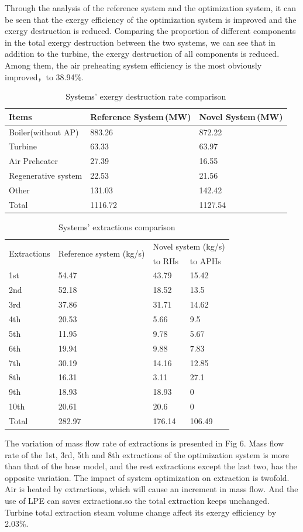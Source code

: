 \documentclass[preprint,12pt]{elsarticle}
\begin{document}
Through the analysis of the reference system and the optimization system, it can be seen that the exergy efficiency of the optimization system is improved and the exergy destruction is reduced.
Comparing the proportion of different components in the total exergy destruction between the two systems, we can see that in addition to the turbine, the exergy destruction of all components is reduced. 
Among them, the air preheating system efficiency is the most obviously improved，to 38.94\%.


\begin{table}
\caption{Systems' exergy destruction rate comparison }
\label{table:system exergy campare}
\centering
\begin{tabular}{lll}
\toprule 
Items & Reference System\,(MW) & Novel System\,(MW)\tabularnewline
\midrule 
Boiler(without AP) & 883.26 & 872.22\tabularnewline
Turbine & 63.33 & 63.97\tabularnewline
Air Preheater  & 27.39 & 16.55\tabularnewline
Regenerative system & 22.53 & 21.56\tabularnewline
Other & 131.03 & 142.42 \tabularnewline
Total & 1116.72 & 1127.54\tabularnewline
\bottomrule
\end{tabular}
\end{table}



\begin{table}
\label{table:extraction compare}
\caption{Systems' extractions comparison}
\begin{centering}
\begin{tabular}{llll}
\toprule 
\multirow{2}{*}{Extractions} & \multirow{2}{2.5cm}{Reference system (kg/s)} & \multicolumn{2}{c}{Novel system (kg/s)}\tabularnewline
\cmidrule{3-4} 
 &  & to RHs & to APHs\tabularnewline
\midrule
1st & 54.47 & 43.79 & 15.42\tabularnewline
2nd & 52.18 & 18.52 & 13.5\tabularnewline
3rd & 37.86 & 31.71 & 14.62\tabularnewline
4th & 20.53 & 5.66 & 9.5\tabularnewline
5th & 11.95 & 9.78 & 5.67\tabularnewline
6th & 19.94 & 9.88 & 7.83\tabularnewline
7th & 30.19 & 14.16 & 12.85\tabularnewline
8th & 16.31 & 3.11 & 27.1\tabularnewline
9th & 18.93 & 18.93 & 0\tabularnewline
10th & 20.61 & 20.6 & 0\tabularnewline
Total & 282.97 & 176.14 & 106.49\tabularnewline
\bottomrule
\end{tabular}
\par\end{centering}
\end{table}
The variation of mass flow rate of extractions is presented in Fig 6.
 Mass flow rate of the 1st, 3rd, 5th and 8th extractions of the optimization system is more than that of the base model, and the rest extractions except the last two, has the opposite variation. 
 The impact of system optimization on extraction is twofold. 
 Air is heated by extractions, which will cause an increment in mass flow. 
 And the use of LPE can saves extractions.so the total extraction keeps unchanged.
 Turbine total extraction steam volume change affect its exergy efficiency by 2.03\%.
\end{document}
